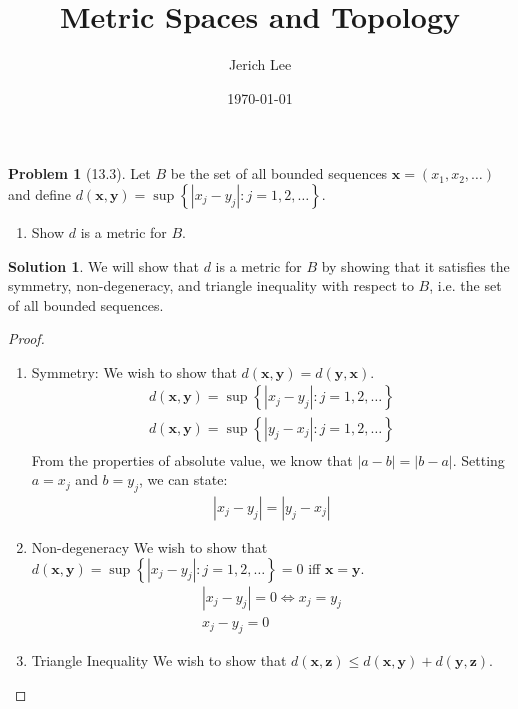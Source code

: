 \documentclass[12pt]{article}
\title{Metric Spaces and Topology}
\author{Jerich Lee}
\date{\today}
\theoremstyle{definition} %
\newtheorem{solution}{Solution}
\newtheorem{problem}{Problem}
\theoremstyle{plain} %
\begin{document}
\maketitle

\begin{problem}[13.3]
Let $B$ be the set of all bounded sequences $\mathbf{x} = (x_{1}, x_{2}, \ldots)$ and define $d(\mathbf{x}, \mathbf{y})=\sup \left\{ \left\vert x_{j}-y_{j}  \right\vert :j=1,2, \ldots   \right\} $.
\begin{enumerate}
    \item Show $d$ is a metric for $B$. 
\end{enumerate}
\end{problem}

\begin{solution}
We will show that $d$ is a metric for $B$ by showing that it satisfies the symmetry, non-degeneracy, and triangle inequality with respect to $B$, i.e. the set of all bounded sequences.
\begin{proof}
 \begin{enumerate}
    \item Symmetry: 
    We wish to show that $d(\mathbf{x}, \mathbf{y})=d(\mathbf{y}, \mathbf{x})$.  \begin{align} d(\mathbf{x}, \mathbf{y}) = \sup\left\{ \left\vert x_{j}-y_{j} \right\vert : j=1,2, \ldots   \right\} \\[10pt]  d(\mathbf{x}, \mathbf{y}) = \sup\left\{ \left\vert y_{j}-x_{j} \right\vert : j=1,2, \ldots   \right\} \\[10pt] \end{align} From the properties of absolute value, we know that $\left\vert a-b \right\vert = \left\vert b-a \right\vert $. Setting $a=x_{j}$ and $b=y_{j} $, we can state: \begin{align} \left\vert x_{j} -y_{j}  \right\vert =\left\vert y_{j} -x_{j}  \right\vert \end{align} \item Non-degeneracy We wish to show that $d(\mathbf{x},\mathbf{y} )=\sup \left\{ \left\vert x_{j}-y_{j}  \right\vert : j=1,2, \ldots   \right\}=0 $ iff $\mathbf{x} =\mathbf{y} $.
   \begin{align}
    \left\vert x_{j} -y_{j}  \right\vert =0  \iff x_{j} =y_{j} \\[10pt] 
    x_{j} -y_{j} =0    
   \end{align}
   \item Triangle Inequality
   We wish to show that $d(\mathbf{x}, \mathbf{z})\leq d(\mathbf{x},\mathbf{y})+d(\mathbf{y}, \mathbf{z})$.

\end{enumerate}
\end{proof}
\end{solution}
\end{document}
